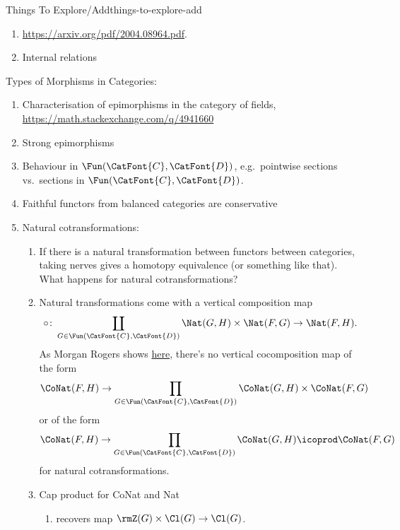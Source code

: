 \begin{remark}{Things To Explore/Add}{things-to-explore-add}
\begin{enumerate}
        \item \url{https://arxiv.org/pdf/2004.08964.pdf}.
        \item Internal relations
    \end{enumerate}
    Types of Morphisms in Categories:
    \begin{enumerate}
        \item Characterisation of epimorphisms in the category of fields, \url{https://math.stackexchange.com/q/4941660}
        \item Strong epimorphisms
        \item Behaviour in $\Fun(\CatFont{C},\CatFont{D})$, e.g.\ pointwise sections vs.\ sections in $\Fun(\CatFont{C},\CatFont{D})$.
        \item Faithful functors from balanced categories are conservative
        \item Natural cotransformations:
            \begin{enumerate}
                \item If there is a natural transformation between functors between categories, taking nerves gives a homotopy equivalence (or something like that). What happens for natural cotransformations?
                \item Natural transformations come with a vertical composition map
                    \[
                        \circ%
                        \colon%
                        \coprod_{G\in\Fun(\CatFont{C},\CatFont{D})}\Nat(G,H)\times\Nat(F,G)%
                        \to%
                        \Nat(F,H).%
                    \]%
                    As Morgan Rogers shows \href{https://categorytheory.zulipchat.com/#narrow/stream/229136-theory.3A-category-theory/topic/.E2.80.9CNatural.20cotransformations.E2.80.9D/near/436863628}{here}, there's no vertical cocomposition map of the form
                    \[
                        \CoNat(F,H)%
                        \to%
                        \prod_{G\in\Fun(\CatFont{C},\CatFont{D})}\CoNat(G,H)\times\CoNat(F,G)%
                    \]%
                    or of the form
                    \[
                        \CoNat(F,H)%
                        \to%
                        \prod_{G\in\Fun(\CatFont{C},\CatFont{D})}\CoNat(G,H)\icoprod\CoNat(F,G)%
                    \]%
                    for natural cotransformations.
                \item Cap product for CoNat and Nat
                    \begin{enumerate}
                        \item recovers map $\rmZ(G)\times\Cl(G)\to\Cl(G)$.

\end{enumerate}
\end{enumerate}
\end{enumerate}
\end{remark}
